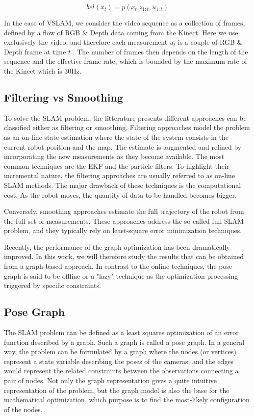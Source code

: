 \[bel(x_t) = p(x_t | z_{1:t}, u_{1:t})\]

In the case of \gls{VSLAM}, we consider the video sequence as a collection of frames, defined by a flow of RGB \& Depth data coming from the Kinect. Here we use exclusively the video, and therefore each measurement $u_t$ is a couple of RGB \& Depth frame at time $t$ . The number of frames then depends on the length of the sequence and the effective frame rate, which is bounded by the maximum rate of the Kinect which is 30Hz.


\subsection{Filtering vs Smoothing}

To solve the \gls{SLAM} problem, the litterature presents different approaches can be classified either as filtering or smoothing. Filtering approaches model the problem as an on-line state estimation where the state of the system consists in the current robot position and the map. The estimate is augmented and refined by incorporating the new measurements as they become available.
The most common techniques are the \gls{EKF} and the particle filters. To highlight their incremental nature, the filtering approaches are usually referred to as on-line \gls{SLAM} methods.
The major drawback of these techniques is the computational cost. As the robot moves, the quantity of data to be handled becomes bigger.

Conversely, smoothing approaches estimate the full trajectory of the robot from the full set of measurements. These approaches address the so-called full \gls{SLAM} problem, and they typically rely on least-square error minimization techniques.

Recently, the performance of the graph optimization has been dramatically improved. In this work, we will therefore study the results that can be obtained from a graph-based approach. In contrast to the online techniques, the pose graph is said to be offline or a "lazy" technique as the optimization processing triggered by specific constraints.

\subsection{Pose Graph}

The \gls{SLAM} problem can be defined as a least squares optimization of an error function described by a graph. Such a graph is called a pose graph. In a general way, the problem can be formulated by a graph where the nodes (or vertices) represent a state variable describing the poses of the cameras, and the edges would represent the related constraints between the observations connecting a pair of nodes. Not only the graph representation gives a quite intuitive representation of the problem, but the graph model is also the base for the mathematical optimization, which purpose is to find the most-likely configuration of the nodes.

